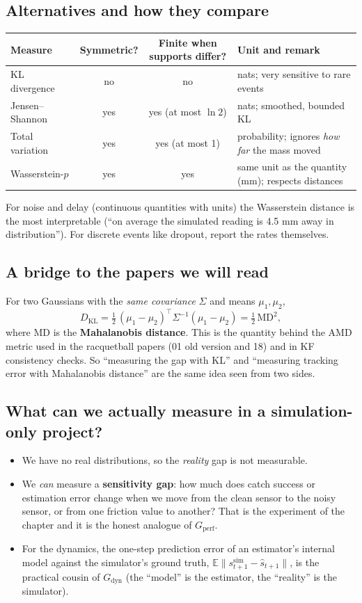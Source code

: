 \documentclass[11pt,a4paper]{article}
\begin{document}
\subsection{Alternatives and how they compare}
\begin{center}
\renewcommand{\arraystretch}{1.25}
\begin{tabularx}{\textwidth}{@{}l c c X@{}}
\toprule
Measure & Symmetric? & Finite when supports differ? & Unit and remark \\
\midrule
KL divergence & no & no & nats; very sensitive to rare events \\
Jensen--Shannon & yes & yes (at most $\ln2$) & nats; smoothed, bounded KL \\
Total variation & yes & yes (at most 1) & probability; ignores \emph{how far} the mass moved \\
Wasserstein-$p$ & yes & yes & same unit as the quantity (mm); respects distances \\
\bottomrule
\end{tabularx}
\end{center}
For noise and delay (continuous quantities with units) the Wasserstein distance is the most
interpretable (``on average the simulated reading is 4.5 mm away in distribution''). For
discrete events like dropout, report the rates themselves.

\subsection{A bridge to the papers we will read}
For two Gaussians with the \emph{same covariance} $\Sigma$ and means $\mu_1,\mu_2$,
\[
D_{\mathrm{KL}}=\tfrac12\,(\mu_1-\mu_2)^\top\Sigma^{-1}(\mu_1-\mu_2)=\tfrac12\,\mathrm{MD}^2,
\]
where MD is the \textbf{Mahalanobis distance}. This is the quantity behind the AMD metric used in
the racquetball papers (01 old version and 18) and in KF consistency checks. So ``measuring the
gap with KL'' and ``measuring tracking error with Mahalanobis distance'' are the same idea seen
from two sides.

\subsection{What can we actually measure in a simulation-only project?}
\begin{itemize}
\item We have no real distributions, so the \emph{reality} gap is not measurable.
\item We \emph{can} measure a \textbf{sensitivity gap}: how much does catch success or estimation
error change when we move from the clean sensor to the noisy sensor, or from one friction value to
another? That is the experiment of the chapter and it is the honest analogue of $G_{\mathrm{perf}}$.
\item For the dynamics, the one-step prediction error of an estimator's internal model against the
simulator's ground truth, $\mathbb E\|s_{t+1}^{\mathrm{sim}}-\hat s_{t+1}\|$, is the practical
cousin of $G_{\mathrm{dyn}}$ (the ``model'' is the estimator, the ``reality'' is the simulator).
\end{itemize}
\end{document}
